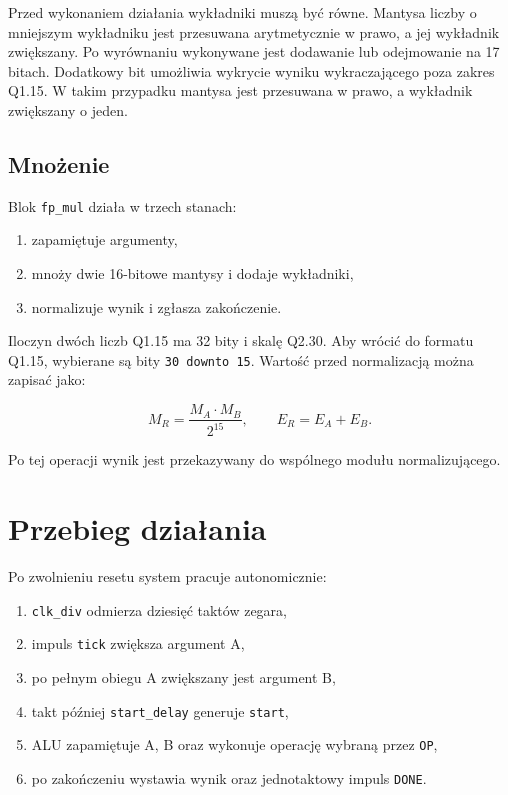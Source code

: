 \documentclass[12pt,a4paper]{article}
\begin{document}
Przed wykonaniem działania wykładniki muszą być równe. Mantysa liczby
o mniejszym wykładniku jest przesuwana arytmetycznie w prawo, a jej wykładnik
zwiększany. Po wyrównaniu wykonywane jest dodawanie lub odejmowanie na
17 bitach. Dodatkowy bit umożliwia wykrycie wyniku wykraczającego poza zakres
Q1.15. W takim przypadku mantysa jest przesuwana w prawo, a wykładnik
zwiększany o jeden.

\subsection{Mnożenie}

Blok \texttt{fp\_mul} działa w trzech stanach:

\begin{enumerate}
    \item zapamiętuje argumenty,
    \item mnoży dwie 16-bitowe mantysy i dodaje wykładniki,
    \item normalizuje wynik i zgłasza zakończenie.
\end{enumerate}

Iloczyn dwóch liczb Q1.15 ma 32 bity i skalę Q2.30. Aby wrócić do formatu
Q1.15, wybierane są bity \texttt{30 downto 15}. Wartość przed normalizacją
można zapisać jako:

\begin{equation}
    M_R = \frac{M_A \cdot M_B}{2^{15}},
    \qquad E_R = E_A + E_B.
\end{equation}

Po tej operacji wynik jest przekazywany do wspólnego modułu normalizującego.

\section{Przebieg działania}

Po zwolnieniu resetu system pracuje autonomicznie:

\begin{enumerate}
    \item \texttt{clk\_div} odmierza dziesięć taktów zegara,
    \item impuls \texttt{tick} zwiększa argument A,
    \item po pełnym obiegu A zwiększany jest argument B,
    \item takt później \texttt{start\_delay} generuje \texttt{start},
    \item ALU zapamiętuje A, B oraz wykonuje operację wybraną przez
          \texttt{OP},
    \item po zakończeniu wystawia wynik oraz jednotaktowy impuls
          \texttt{DONE}.
\end{enumerate}
\end{document}
